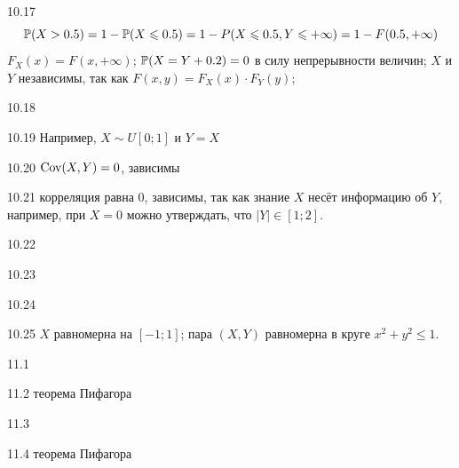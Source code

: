 \protect \hypertarget {soln:10.17}{}
\begin{solution}{{10.17}}
  \[
  \P(X>0.5) = 1 - \P(X\leq 0.5) = 1 - P(X\leq 0.5, Y\leq +\infty) = 1 - F(0.5, +\infty)
  \]
  $F_X(x)=F(x, +\infty)$; $\P(X=Y+0.2)=0$ в силу непрерывности величин; $X$ и $Y$ независимы, так как $F(x,y)=F_X(x)\cdot F_Y(y)$;
\end{solution}
\protect \hypertarget {soln:10.18}{}
\begin{solution}{{10.18}}
\end{solution}
\protect \hypertarget {soln:10.19}{}
\begin{solution}{{10.19}}
  Например, $X\sim U[0;1]$ и $Y=X$
\end{solution}
\protect \hypertarget {soln:10.20}{}
\begin{solution}{{10.20}}
    $\Cov(X,Y)=0$, зависимы
\end{solution}
\protect \hypertarget {soln:10.21}{}
\begin{solution}{{10.21}}
  корреляция равна $0$, зависимы, так как знание $X$ несёт информацию об $Y$, например, при $X=0$ можно утверждать, что $|Y| \in [1;2]$.
\end{solution}
\protect \hypertarget {soln:10.22}{}
\begin{solution}{{10.22}}
\end{solution}
\protect \hypertarget {soln:10.23}{}
\begin{solution}{{10.23}}
\end{solution}
\protect \hypertarget {soln:10.24}{}
\begin{solution}{{10.24}}
\end{solution}
\protect \hypertarget {soln:10.25}{}
\begin{solution}{{10.25}}
$X$ равномерна на $[-1;1]$; пара $(X, Y)$ равномерна в круге $x^2+y^2 \leq 1$.
\end{solution}
\protect \hypertarget {soln:11.1}{}
\begin{solution}{{11.1}}
\end{solution}
\protect \hypertarget {soln:11.2}{}
\begin{solution}{{11.2}}
теорема Пифагора
\end{solution}
\protect \hypertarget {soln:11.3}{}
\begin{solution}{{11.3}}
\end{solution}
\protect \hypertarget {soln:11.4}{}
\begin{solution}{{11.4}}
теорема Пифагора
\end{solution}
\protect \hypertarget {soln:11.5}{}
